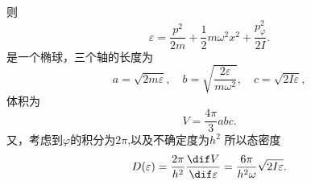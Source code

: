 \documentclass[12pt]{article}
\begin{document}
则
\begin{equation}
	\varepsilon = \frac{p^2}{2m} + \frac{1}{2} m \omega^2 x^2 + \frac{p^2_\varphi}{2I}.
\end{equation}
是一个椭球，三个轴的长度为
\begin{equation}
	a=\sqrt{2m\varepsilon},\quad b=\sqrt{\frac{2\varepsilon}{m \omega^2}},\quad c=\sqrt{2I\varepsilon},
\end{equation}
体积为
\begin{equation}
	V = \frac{4\pi}{3} abc.
\end{equation}
又，考虑到$\varphi$的积分为$2\pi$,以及不确定度为$h^2$
所以态密度
\begin{equation}
	D(\varepsilon) = \frac{2\pi}{h^2}\frac{\dif V}{\dif \varepsilon} = \frac{6\pi}{h^2\omega} \sqrt{2I\varepsilon}.
\end{equation}
















\end{document}
